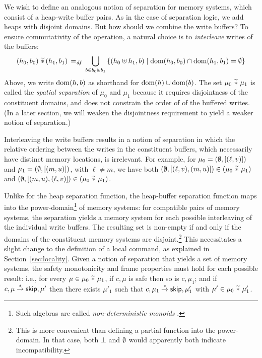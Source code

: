\documentclass[11pt]{report}
\begin{document}
We wish to define an analogous notion of separation for memory systems, which consist of a heap-write buffer pairs. As in the case of separation logic, we add heaps with disjoint domains. But how should we combine the write buffers? To ensure commutativity of the operation, a natural choice is to \emph{interleave} writes of the buffers: \[ (h_0,b_0) \operatorname{\,\widetilde{\ast}\,} (h_1,b_1) \operatorname{\;=_{\mathit{df}}\;} \bigcup_{b \in b_0 \uplus b_1}
    \left\lbrace (h_0 \uplus h_1, b) \mid \operatorname{\mathrm{dom}}(h_0,b_0) \cap \operatorname{\mathrm{dom}}(h_1,b_1) = \operatorname{\emptyset} \right\rbrace
\] Above, we write $\operatorname{\mathrm{dom}}(h,b)$ as shorthand for $\operatorname{\mathrm{dom}}(h) \cup \operatorname{\mathrm{dom}}(b)$. The set $\mu_0 \operatorname{\,\widetilde{\ast}\,} \mu_1$ is called the \emph{spatial separation} of $\mu_0$ and $\mu_1$ because it requires disjointness of the constituent domains, and does not constrain the order of of the buffered writes. (In a later section, we will weaken the disjointness requirement to yield a weaker notion of separation.)

Interleaving the write buffers results in a notion of separation in which the relative ordering between the writes in the constituent buffers, which necessarily have distinct memory locations, is irrelevant. For example, for $\mu_0 = (\operatorname{\emptyset},\left[(\ell,v)\right])$ and $\mu_1 = (\operatorname{\emptyset},\left[(m,u)\right])$, with $\ell \neq m$, we have both $(\operatorname{\emptyset},\left[(\ell,v),(m,u)\right]) \in (\mu_0 \operatorname{\,\widetilde{\ast}\,} \mu_1)$ and $(\operatorname{\emptyset},\left[(m,u),(\ell,v)\right]) \in (\mu_0 \operatorname{\,\widetilde{\ast}\,} \mu_1)$. 

Unlike for the heap separation function, the heap-buffer separation function maps into the power-domain\footnote{Such algebras are called \emph{non-deterministic monoids} \cite{DBLP:conf/fsttcs/GalmicheL06}.} of memory systems: for compatible pairs of memory systems, the separation yields a memory system for each possible interleaving of the individual write buffers. The resulting set is non-empty if and only if the domains of the constituent memory systems are disjoint.\footnote{This is more convenient than defining a partial function into the power-domain. In that case, both $\bot$ and $\operatorname{\emptyset}$ would apparently both indicate incompatibility.} This necessitates a slight change to the definition of a local command, as explained in Section~\ref{sec:locality}. Given a notion of separation that yields a set of memory systems, the safety monotonicity and frame properties must hold for each possible result: i.e., for every $\mu \in \mu_0 \operatorname{\,\widetilde{\ast}\,} \mu_1$, if $c,\mu$ is safe then so is $c,\mu_1$; and if $c,\mu \stackrel{\ast}{\rightarrow} \operatorname{\mathsf{skip}},\mu'$ then there exists $\mu'_1$ such that $c,\mu_1 \stackrel{\ast}{\rightarrow} \operatorname{\mathsf{skip}},\mu'_1$ with $\mu' \in \mu_0 \operatorname{\,\widetilde{\ast}\,} \mu'_1$. 
\end{document}

